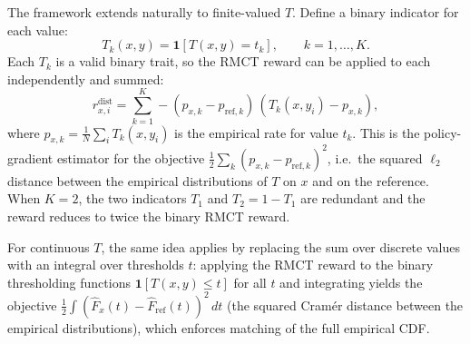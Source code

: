 \documentclass{article}
\begin{document}
The framework extends naturally to finite-valued $T$. Define a binary indicator for each value:
\begin{equation}
T_k(x, y) = \mathbf{1}[T(x, y) = t_k], \qquad k = 1, \ldots, K.
\end{equation}
Each $T_k$ is a valid binary trait, so the RMCT reward can be applied to each independently and summed:
\begin{equation}
r^{\text{dist}}_{x,i} = \sum_{k=1}^{K} -(p_{x,k} - p_{\text{ref},k})\,(T_k(x, y_i) - p_{x,k}),
\end{equation}
where $p_{x,k} = \frac{1}{N}\sum_i T_k(x, y_i)$ is the empirical rate for value $t_k$. This is the policy-gradient estimator for the objective $\frac{1}{2}\sum_k (p_{x,k} - p_{\text{ref},k})^2$, i.e.\ the squared $\ell_2$ distance between the empirical distributions of $T$ on $x$ and on the reference. When $K=2$, the two indicators $T_1$ and $T_2 = 1 - T_1$ are redundant and the reward reduces to twice the binary RMCT reward.

For continuous $T$, the same idea applies by replacing the sum over discrete values with an integral over thresholds $t$: applying the RMCT reward to the binary thresholding functions $\mathbf{1}[T(x, y) \leq t]$ for all $t$ and integrating yields the objective $\frac{1}{2}\int(\hat{F}_x(t) - \hat{F}_{\text{ref}}(t))^2\,dt$ (the squared Cram\'{e}r distance between the empirical distributions), which enforces matching of the full empirical CDF.
\end{document}
